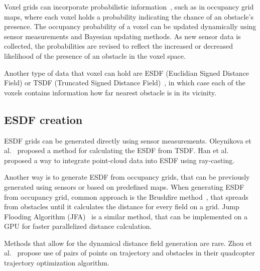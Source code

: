 \documentclass[letterpaper, 10 pt, conference]{ieeeconf}  %
\begin{document}
Voxel grids can incorporate probabilistic information~\cite{thrun2002probabilistic, dryanovski2010multivolume}, such as in occupancy grid maps, where each voxel holds a probability indicating the chance of an obstacle's presence. The occupancy probability of a voxel can be updated dynamically using sensor measurements and Bayesian updating methods. As new sensor data is collected, the probabilities are revised to reflect the increased or decreased likelihood of the presence of an obstacle in the voxel space. 

Another type of data that voxel  can hold are ESDF (Euclidian Signed Distance Field) or TSDF (Truncated Signed Distance Field)~\cite{oleynikova2017voxblox}, in which case each of the voxels contains information how far nearest obstacle is in its vicinity.

\subsection{ESDF creation}

ESDF grids can be generated directly using sensor measurements. Oleynikova et al.~\cite{oleynikova2017voxblox} proposed a method for calculating the ESDF from TSDF. Han et al.~\cite{han2019fiesta} proposed a way to integrate point-cloud data into ESDF using ray-casting.  

Another way is to generate ESDF from occupancy grids, that can be previously generated using sensors or based on predefined maps. When generating ESDF from occupancy grid, common approach is the Brushfire method~\cite{lau2010improved}, that spreads from obstacles until it calculates the distance for every field on a grid. Jump Flooding Algorithm (JFA)~\cite{rong2006jump} is a similar method, that can be implemented on a GPU for faster parallelized distance calculation.  

Methods that allow for the dynamical distance field generation are rare. Zhou et al.~\cite{zhou2021egoplanner} propose use of pairs of points on trajectory and obstacles in their quadcopter trajectory optimization algorithm.

\end{document}
